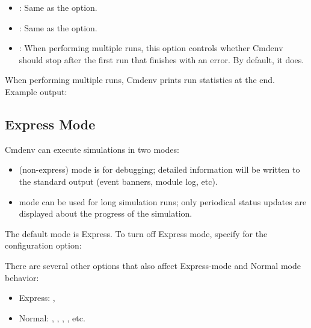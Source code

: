 \begin{itemize}
    \item {} : Same as the  option.
    \item {} : Same as the  option.
    \item {} : When performing multiple runs,
           this option controls whether Cmdenv should stop after the first run
           that finishes with an error. By default, it does.
\end{itemize}

When performing multiple runs, Cmdenv prints run statistics at the end. Example
output:



\subsection{Express Mode}
\label{sec:run-sim:cmdenv:express-mode}

Cmdenv can execute simulations in two modes:

\begin{itemize}
    \item {} (non-express) mode is for debugging; detailed information
        will be written to the standard output (event banners, module log,
        etc).
    \item {} mode can be used for long simulation runs; only
        periodical status updates are displayed about the progress of the
        simulation.
\end{itemize}

The default mode is Express. To turn off Express mode, specify  for
the  configuration option:
 

There are several other options that also affect Express-mode and Normal
mode behavior:

\begin{itemize}
  \item Express: , 
  \item Normal: , ,
        , , etc.
\end{itemize}


